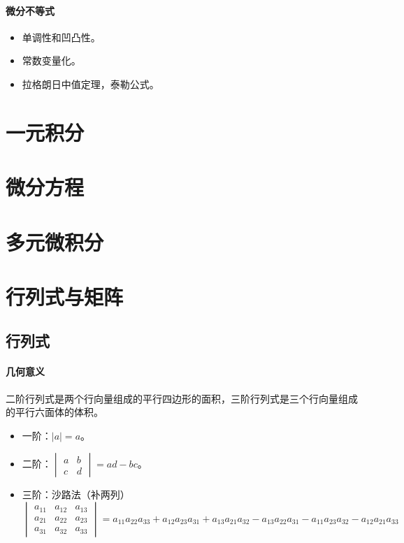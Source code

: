 \documentclass[
12pt, %
a4paper, 
oneside, %
headinclude,footinclude, %
]{scrartcl}
\begin{document}
\paragraph{微分不等式}
\begin{itemize}
\item 单调性和凹凸性。
\item 常数变量化。
\item 拉格朗日中值定理，泰勒公式。
\end{itemize}
\section{一元积分}
\section{微分方程}
\section{多元微积分}
\section{行列式与矩阵}
\subsection[行列式]{行列式}
\paragraph{几何意义}
二阶行列式是两个行向量组成的平行四边形的面积，三阶行列式是三个行向量组成的平行六面体的体积。
\begin{itemize}
\item 一阶：$ |a| = a $。
\item 二阶：$\begin{vmatrix} a & b \\ c & d \end{vmatrix} = ad - bc $。
\item 三阶：沙路法（补两列）
$$
\begin{vmatrix}
a_{11} & a_{12} & a_{13} \\
a_{21} & a_{22} & a_{23} \\
a_{31} & a_{32} & a_{33}
\end{vmatrix}
= a_{11}a_{22}a_{33} + a_{12}a_{23}a_{31} + a_{13}a_{21}a_{32} 
- a_{13}a_{22}a_{31} - a_{11}a_{23}a_{32} - a_{12}a_{21}a_{33}
$$
\end{itemize}
\end{document}
